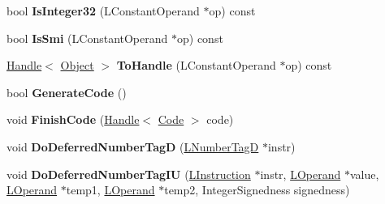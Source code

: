 \begin{DoxyCompactItemize}
\item 
bool {\bfseries Is\+Integer32} (L\+Constant\+Operand $\ast$op) const \hypertarget{classv8_1_1internal_1_1_l_code_gen_a2d621118ecad14881a0c90e0989b31e0}{}\label{classv8_1_1internal_1_1_l_code_gen_a2d621118ecad14881a0c90e0989b31e0}

\item 
bool {\bfseries Is\+Smi} (L\+Constant\+Operand $\ast$op) const \hypertarget{classv8_1_1internal_1_1_l_code_gen_ae0339cb277e927ff5d2073eb7790018a}{}\label{classv8_1_1internal_1_1_l_code_gen_ae0339cb277e927ff5d2073eb7790018a}

\item 
\hyperlink{classv8_1_1internal_1_1_handle}{Handle}$<$ \hyperlink{classv8_1_1internal_1_1_object}{Object} $>$ {\bfseries To\+Handle} (L\+Constant\+Operand $\ast$op) const \hypertarget{classv8_1_1internal_1_1_l_code_gen_ab75f8785eb99d07a1585c9402a3b4d5e}{}\label{classv8_1_1internal_1_1_l_code_gen_ab75f8785eb99d07a1585c9402a3b4d5e}

\item 
bool {\bfseries Generate\+Code} ()\hypertarget{classv8_1_1internal_1_1_l_code_gen_aa1307599a440d099f0dbb5dc24f4f59c}{}\label{classv8_1_1internal_1_1_l_code_gen_aa1307599a440d099f0dbb5dc24f4f59c}

\item 
void {\bfseries Finish\+Code} (\hyperlink{classv8_1_1internal_1_1_handle}{Handle}$<$ \hyperlink{classv8_1_1internal_1_1_code}{Code} $>$ code)\hypertarget{classv8_1_1internal_1_1_l_code_gen_a5278837d092b8413daa548719c34864c}{}\label{classv8_1_1internal_1_1_l_code_gen_a5278837d092b8413daa548719c34864c}

\item 
void {\bfseries Do\+Deferred\+Number\+TagD} (\hyperlink{classv8_1_1internal_1_1_l_number_tag_d}{L\+Number\+TagD} $\ast$instr)\hypertarget{classv8_1_1internal_1_1_l_code_gen_af3b589c0911c5e01a018ecee64b7e926}{}\label{classv8_1_1internal_1_1_l_code_gen_af3b589c0911c5e01a018ecee64b7e926}

\item 
void {\bfseries Do\+Deferred\+Number\+Tag\+IU} (\hyperlink{classv8_1_1internal_1_1_l_instruction}{L\+Instruction} $\ast$instr, \hyperlink{classv8_1_1internal_1_1_l_operand}{L\+Operand} $\ast$value, \hyperlink{classv8_1_1internal_1_1_l_operand}{L\+Operand} $\ast$temp1, \hyperlink{classv8_1_1internal_1_1_l_operand}{L\+Operand} $\ast$temp2, Integer\+Signedness signedness)\hypertarget{classv8_1_1internal_1_1_l_code_gen_a81fedc95085cf988c8e3d548e1c9a5f1}{}\label{classv8_1_1internal_1_1_l_code_gen_a81fedc95085cf988c8e3d548e1c9a5f1}


\end{DoxyCompactItemize}
